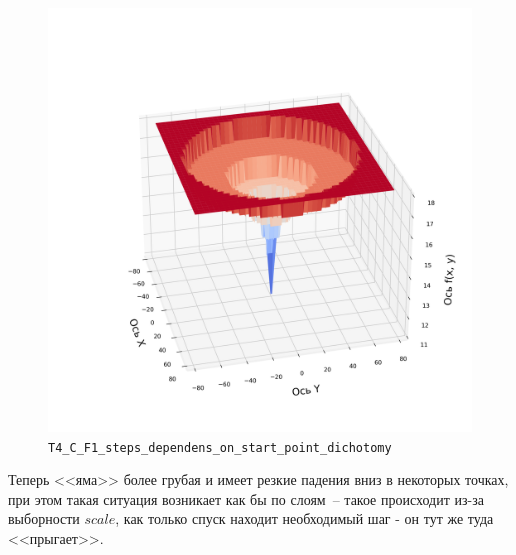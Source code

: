 \documentclass[12pt, a4paper, oneside, final]{article}
\begin{document}
	\begin{figure}[H]
		\centering
		\includegraphics[scale=0.68]{Image/T4_C_F1_steps_dependens_on_start_point_dichotomy.png}
		\caption*{\texttt{T4\_C\_F1\_steps\_dependens\_on\_start\_point\_dichotomy}}
	\end{figure}
	Теперь <<яма>> более грубая и имеет резкие падения вниз в некоторых точках, при этом такая ситуация возникает как бы по слоям~-- такое происходит из-за выборности $scale$, как только спуск находит необходимый шаг - он тут же туда <<прыгает>>.
\end{document}

